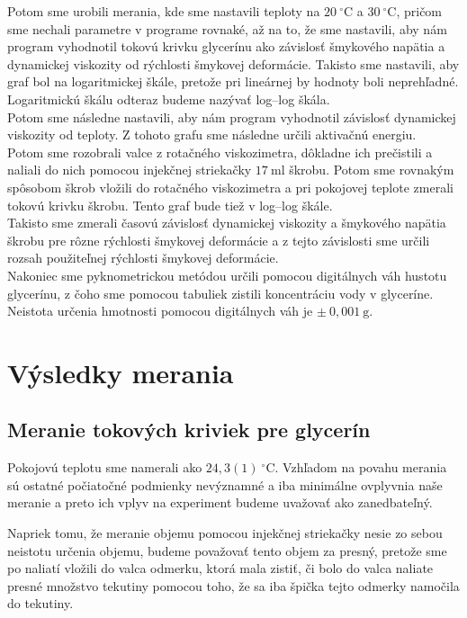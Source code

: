 \documentclass{prepareprotokol} %
\begin{document}
Potom sme urobili merania, kde sme nastavili teploty na $20~^\circ \mathrm{C}$ a $30~^\circ \mathrm{C}$, pričom sme nechali parametre v programe rovnaké, až na to, že sme nastavili, aby nám program vyhodnotil tokovú krivku glycerínu ako závislosť šmykového napätia a dynamickej viskozity od rýchlosti šmykovej deformácie. 
Takisto sme nastavili, aby graf bol na  logaritmickej škále, pretože pri lineárnej by hodnoty boli neprehľadné. 
Logaritmickú škálu odteraz budeme nazývať log--log škála.\\

Potom sme následne nastavili, aby nám program vyhodnotil závislosť dynamickej viskozity od teploty. 
Z tohoto grafu sme následne určili aktivačnú energiu. \\

Potom sme rozobrali valce z rotačného viskozimetra, dôkladne ich prečistili a naliali do nich pomocou injekčnej striekačky $17~\mathrm{ml}$ škrobu. 
Potom sme rovnakým spôsobom škrob vložili do rotačného viskozimetra a pri pokojovej teplote zmerali tokovú krivku škrobu. 
Tento graf bude tiež v log--log škále.\\

Takisto sme zmerali časovú závislosť dynamickej viskozity a šmykového napätia škrobu pre rôzne rýchlosti šmykovej deformácie a z tejto závislosti sme určili rozsah použiteľnej rýchlosti šmykovej deformácie.\\

Nakoniec sme pyknometrickou metódou určili pomocou digitálnych váh hustotu glycerínu, z čoho sme pomocou tabuliek zistili koncentráciu vody v glyceríne.
Neistota určenia hmotnosti pomocou digitálnych váh je $\pm~0,001~\mathrm{g}$.



\newpage
\section*{Výsledky merania}
\subsection*{Meranie tokových kriviek pre glycerín}

Pokojovú teplotu sme namerali ako $24,3(1)~^\circ \mathrm{C}$.
Vzhľadom na povahu merania sú ostatné počiatočné podmienky nevýznamné a iba minimálne ovplyvnia naše meranie a preto ich vplyv na experiment budeme uvažovať ako zanedbateľný.

Napriek tomu, že meranie objemu pomocou injekčnej striekačky nesie zo sebou neistotu určenia objemu, budeme považovať tento objem za presný, pretože sme po naliatí vložili do valca odmerku, ktorá mala zistiť, či bolo do valca naliate presné množstvo tekutiny pomocou toho, že sa iba špička tejto odmerky namočila do tekutiny.
\end{document}
